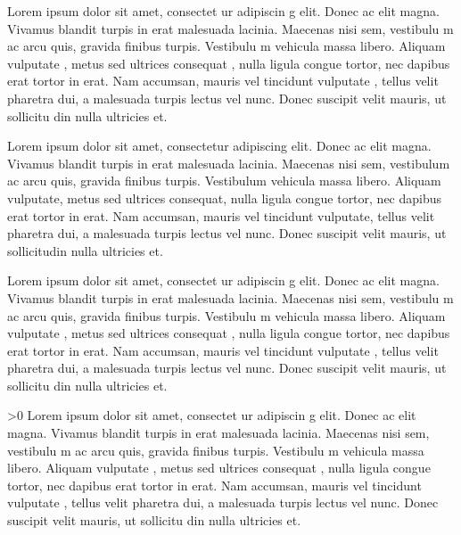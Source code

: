 \begin{something}
	Lorem
	ipsum
	dolor sit
	amet,
	consectet
	ur
	adipiscin
	g elit.
	Donec ac
	elit
	magna.
	Vivamus
	blandit
	turpis in
	erat
	malesuada
	lacinia.
	Maecenas
	nisi sem,
	vestibulu
	m ac arcu
	quis,
	gravida
	finibus
	turpis.
	Vestibulu
	m
	vehicula
	massa
	libero.
	Aliquam
	vulputate
	, metus
	sed
	ultrices
	consequat
	, nulla
	ligula
	congue
	tortor,
	nec
	dapibus
	erat
	tortor in
	erat. Nam
	accumsan,
	mauris
	vel
	tincidunt
	vulputate
	, tellus
	velit
	pharetra
	dui, a
	malesuada
	turpis
	lectus
	vel nunc.
	Donec
	suscipit
	velit
	mauris,
	ut
	sollicitu
	din nulla
	ultricies
	et.
\end{something}
\begin{another}
	Lorem ipsum dolor sit amet,
	consectetur adipiscing elit.
	Donec ac elit magna. Vivamus
	blandit turpis in erat
	malesuada lacinia. Maecenas
	nisi sem, vestibulum ac arcu
	quis, gravida finibus turpis.
	 Vestibulum vehicula massa
	libero. Aliquam vulputate,
	metus sed ultrices consequat,
	nulla ligula congue tortor,
	nec dapibus erat tortor in
	erat. Nam accumsan, mauris
	vel tincidunt vulputate,
	tellus velit pharetra dui, a
	malesuada turpis lectus vel
	nunc. Donec suscipit velit
	mauris, ut sollicitudin nulla
	ultricies et.
\end{another}
\begin{cmh}
	Lorem
	ipsum
	dolor sit
	amet,
	consectet
	ur
	adipiscin
	g elit.
	Donec ac
	elit
	magna.
	Vivamus
	blandit
	turpis in
	erat
	malesuada
	lacinia.
	Maecenas
	nisi sem,
	vestibulu
	m ac arcu
	quis,
	gravida
	finibus
	turpis.
	Vestibulu
	m
	vehicula
	massa
	libero.
	Aliquam
	vulputate
	, metus
	sed
	ultrices
	consequat
	, nulla
	ligula
	congue
	tortor,
	nec
	dapibus
	erat
	tortor in
	erat. Nam
	accumsan,
	mauris
	vel
	tincidunt
	vulputate
	, tellus
	velit
	pharetra
	dui, a
	malesuada
	turpis
	lectus
	vel nunc.
	Donec
	suscipit
	velit
	mauris,
	ut
	sollicitu
	din nulla
	ultricies
	et.
\end{cmh}
\ifnum\x>0
	Lorem
	ipsum
	dolor sit
	amet,
	consectet
	ur
	adipiscin
	g elit.
	Donec ac
	elit
	magna.
	Vivamus
	blandit
	turpis in
	erat
	malesuada
	lacinia.
	Maecenas
	nisi sem,
	vestibulu
	m ac arcu
	quis,
	gravida
	finibus
	turpis.
	Vestibulu
	m
	vehicula
	massa
	libero.
	Aliquam
	vulputate
	, metus
	sed
	ultrices
	consequat
	, nulla
	ligula
	congue
	tortor,
	nec
	dapibus
	erat
	tortor in
	erat. Nam
	accumsan,
	mauris
	vel
	tincidunt
	vulputate
	, tellus
	velit
	pharetra
	dui, a
	malesuada
	turpis
	lectus
	vel nunc.
	Donec
	suscipit
	velit
	mauris,
	ut
	sollicitu
	din nulla
	ultricies
	et.
\fi
